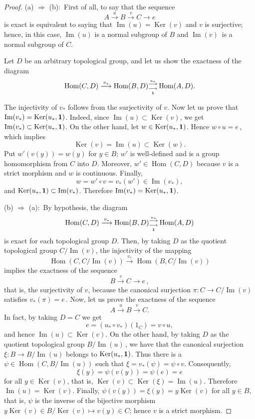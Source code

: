 \documentclass[12pt]{amsart}
\theoremstyle{theorem}
\theoremstyle{definition}
\theoremstyle{remark} \theoremstyle{question} \theoremstyle{example}
\def\Hom{\operatorname{{Hom}}}
\def\Ker{\operatorname{{Ker}}}
\def\mI{\operatorname{{Im}}}
\begin{document}
\begin{proof}
(a) $\Rightarrow$ (b):\, First of all, to say that the sequence
$$
A \overset{u}{\longrightarrow} B \overset{v}{\longrightarrow} C \longrightarrow e
$$
is exact is equivalent to saying that $\mI(u) = \Ker(v)$ and $v$ is
surjective; hence, in this case, $\mI(u)$ is a normal subgroup of $B$
and $\mI(v)$\,  is a normal subgroup of $C$.

Let $D$ be an arbitrary topological group, and let us show the exactness
of the diagram
$$
\Hom(C,D) \overset{v_*}{\longrightarrow} \Hom(B,D)^{\overset{u_*}{\longrightarrow}}_{\underset{\bf 1}{\longrightarrow}} \Hom(A,D).
$$

The injectivity of $v_*$ follows from the surjectivity of $v$.
Now let us prove that $\mI(v_*) = \Ker(u_*,{\bf 1})$.
Indeed, since $\mI(u) \subset \Ker(v)$, we get
$\mI(v_*) \subset \Ker(u_*,\bf 1)$. On the other hand, let
$w \in \Ker(u_*,\bf 1)$. Hence $w \circ u = e$\,, which implies
$$
\Ker(v) = \mI(u) \subset \Ker(w).
$$
Put $w'(v(y)) = w(y)$ for $y \in B$; $w'$ is well-defined and is a group
homomorphism from $C$ into $D$. Moreover, $w' \in \Hom(C,D)$ because $v$
is a strict morphism and $w$ is continuous. Finally,
$$
w = w' \circ v = v_*(w') \in \mI(v_*),
$$
and $\Ker(u_*,{\bf 1}) \subset \mI(v_*)$. Therefore
$\mI(v_*) = \Ker(u_*,\bf 1)$.

\smallskip

\noindent (b) $\Rightarrow$ (a):\, By hypothesis, the diagram
$$
\Hom(C,D) \overset{v_*}{\longrightarrow} \Hom(B,D){}^{\overset{u_*}{\longrightarrow}}_{\underset{\bf 1}{\longrightarrow}} \Hom(A,D)
$$
is exact for each topological group $D$. Then, by taking $D$ as the quotient
topological group $C/\mI(v)$, the injectivity of the mapping
$$
\Hom(C,C/\mI(v)) \overset{v_*}{\longrightarrow} \Hom(B, C/\mI(v))
$$
implies the exactness of the sequence
$$
B \overset{v}{\longrightarrow} C \longrightarrow e\,,
$$
that is, the surjectivity of $v$, because the canonical surjection
$\pi\colon C \to C/\mI(v)$ satisfies $v_*(\pi) = e$\,. Now, let us prove
the exactness of the sequence
$$
A \overset{u}{\longrightarrow} B \overset{v}{\longrightarrow} C.
$$
In fact, by taking $D = C$ we get
$$
e = (u_* \circ v_*)(1_C) = v \circ u,
$$
and hence $\mI(u) \subset \Ker(v)$. On the other hand, by taking $D$ as the
quotient topological group $B/\mI(u)$\,, we have that the canonical
surjection $\xi\colon B \to B/\mI(u)$ belongs to $\Ker(u_*,{\bf 1})$.
Thus there is a $\psi \in \Hom(C, B/\mI(u))$ such that
$\xi = v_*(\psi) = \psi \circ v$. Consequently,
$$
\xi(y) = \psi(v(y)) = \psi(e) = e
$$
for all $y \in \Ker(v)$, that is, $\Ker(v) \subset \Ker(\xi) = \mI(u)$.
Therefore $\mI(u) = \Ker(v)$. Finally, $\psi(v(y)) = \xi(y) = y\Ker(v)$
for all $y \in B$, that is, $\psi$ is the inverse of the bijective morphism
$y\Ker(v) \in B/\Ker(v) \mapsto v(y) \in C$; hence $v$ is a strict morphism.
\end{proof}
\end{document}
